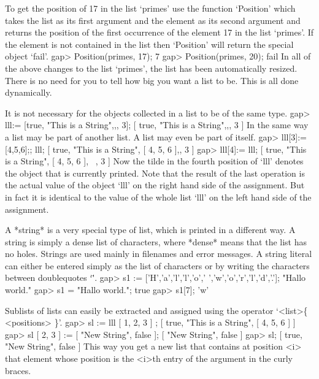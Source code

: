 To get the position    of 17 in  the   list  `primes' use   the  function
`Position' which takes the list as its  first argument and the element as
its second argument  and returns the position of  the first occurrence of
the element 17 in the list `primes'.
If the element is not contained in the list then `Position' will return
the special object `fail'.
\beginexample
gap> Position(primes, 17);
7
gap> Position(primes, 20);
fail
\endexample
In  all  of the  above changes to  the  list `primes',  the list has been
automatically resized.  There  is no need  for you to tell {\GAP} how big
you want a list to be.  This is all done dynamically.

It is not necessary for the objects collected in a list to be of the same
type.
\beginexample
gap> lll:= [true, "This is a String",,, 3];
[ true, "This is a String",,, 3 ] 
\endexample
In the same way a list may be part of another  list.  A list  may even be
part of itself.
\beginexample
gap> lll[3]:= [4,5,6];; lll;
[ true, "This is a String", [ 4, 5, 6 ],, 3 ]
gap> lll[4]:= lll;
[ true, "This is a String", [ 4, 5, 6 ], ~, 3 ] 
\endexample
Now the tilde in the fourth position of `lll'  denotes the object that is
currently  printed. Note that  the result  of the  last operation is  the
actual value  of  the  object  `lll'   on  the  right  hand side  of  the
assignment. But in  fact it is  identical to the value  of the whole list
`lll' on the left hand side of the assignment.

%
A *string*  is a very  special   type of  list,  which  is  printed in  a
different way.  A string  is simply  a  dense list of   characters, where
*dense* means  that the list  has no holes.   Strings are used  mainly in
filenames and   error messages. A  string  literal can either  be entered
simply as the  list of characters  or  by writing the characters  between
doublequotes `\"'.
\beginexample
gap> s1 := ['H','a','l','l','o',' ','w','o','r','l','d','.'];
"Hallo world."
gap> s1 = "Hallo world.";
true
gap> s1[7];
'w' 
\endexample

%

Sublists of lists can easily be extracted and assigned using the operator
`<list>\{ <positions> \}'.
\beginexample
gap> sl := lll{ [ 1, 2, 3 ] };
[ true, "This is a String", [ 4, 5, 6 ] ]
gap> sl{ [ 2, 3 ] } := [ "New String", false ];
[ "New String", false ]
gap> sl;
[ true, "New String", false ] 
\endexample
This way you get  a new list that  contains at position <i> that  element
whose position is the <i>th entry of the argument in the curly braces.

